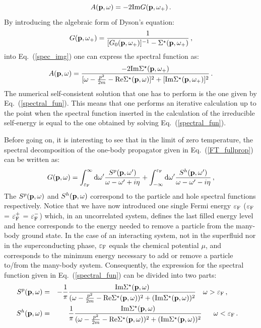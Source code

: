 \begin{equation}
\label{spec_img}
A({\bf p},\omega)=-2{\rm Im}G({\bf p},\omega_+)\,.
\end{equation}
By introducing the algebraic form of Dyson's equation:
\begin{equation}
G({\bf p},\omega_+)=\frac{1}{[G_0({\bf p},\omega_+)]^{-1}-\Sigma^\star({\bf p},\omega_+)}\,,
\label{G_algebraic}
\end{equation}
into Eq.~(\ref{spec_img})
one can express the spectral function as:
\begin{equation}
A({\bf p},\omega)=\frac{-2\mathrm{Im}\Sigma^\star({\bf p},\omega_+)}
{[\omega-\frac{p^2}{2m}-\mathrm{Re}\Sigma^\star({\bf p},\omega)]^2+[\rm{Im}\Sigma^\star({\bf p},\omega_+)]^2} \,.
\label{spectral_fun}
\end{equation}
The numerical self-consistent solution that one has to perform is the one given by Eq.~(\ref{spectral_fun}). This means that one performs an iterative calculation up to the point when the spectral function inserted in the calculation of the irreducible self-energy is equal to the one obtained by solving Eq.~(\ref{spectral_fun}).

Before going on, it is interesting to see that in the limit of zero temperature, the spectral decomposition of the one-body propagator given in Eq.~(\ref{FT_fullprop}) can be written as:
\begin{equation}
G({\bf p},\omega)=\int_{\varepsilon_\textrm F}^\infty\mathrm d\omega'\frac{S^p({\bf p},\omega')}{\omega-\omega'+i\eta}
+\int_{-\infty}^{\varepsilon_\textrm F}\mathrm d\omega'\frac{S^h({\bf p},\omega')}{\omega-\omega'-i\eta}\,,
\label{Lehm_infty}
\end{equation}
The $S^p({\bf p},\omega)$ and $S^h({\bf p},\omega)$ correspond to the particle and hole spectral functions respectively. Notice that we have now introduced one single Fermi energy $\varepsilon_\textrm F$ ($\varepsilon_\textrm F$ = $\varepsilon_\textrm F^+$ = $\varepsilon_\textrm F^-$) which, in an uncorrelated system, defines the last filled energy level and hence corresponds to the energy needed to remove a particle from the many-body ground state. In the case of an interacting system, not in the superfluid nor in the superconducting phase, $\varepsilon_\textrm F$ equals the chemical potential $\mu$, and corresponds to the minimum energy necessary to add or remove a particle to/from the many-body system. Consequently, the expression for the spectral function given in Eq.~(\ref{spectral_fun}) can be divided into two parts:
\begin{eqnarray}
S^p({\bf p},\omega)&=&-\frac{1}{\pi}\frac{\mathrm{Im}\Sigma^\star({\bf p},\omega)}
{(\omega-\frac{p^2}{2m}-\mathrm{Re}\Sigma^\star({\bf p},\omega))^2+(\rm{Im}\Sigma^\star({\bf p},\omega))^2} \quad \omega>\varepsilon_\textrm F\,,\qquad\,\,\,
\label{Sp_self}
\\ 
S^h({\bf p},\omega)&=&\frac{1}{\pi}\frac{\mathrm{Im}\Sigma^\star({\bf p},\omega)}
{(\omega-\frac{p^2}{2m}-\mathrm{Re}\Sigma^\star({\bf p},\omega))^2+(\rm{Im}\Sigma^\star({\bf p},\omega))^2} \quad\,\,\,\, \omega<\varepsilon_\textrm F\,.\quad
\label{Sh_self}
\end{eqnarray}

